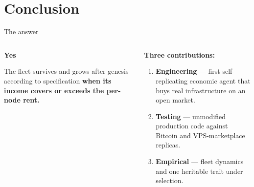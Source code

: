 
{
  \renewcommand{\sectionsubtitle}{Limitations, and what comes next}
  \section{Conclusion}
}

{
\setlength{\splitpos}{-0.55\paperwidth} %
\rightfooterwhitetrue
\begin{frame}{The answer}
  \begin{columns}[T]
    \begin{textcolumn}
      \large
      \textbf{Yes}

      \medskip
      The fleet survives and grows after genesis according to specification \textbf{when its income
      covers or exceeds the per-node rent.}
    \end{textcolumn}
    \begin{textcolumn}
      \color{white}
        \small
      \textbf{Three contributions:}
      \begin{enumerate}\color{white}
        \item \textbf{Engineering} --- first self-replicating economic agent that
          buys real infrastructure on an open market.
        \item \textbf{Testing} --- unmodified production code against
          Bitcoin and VPS-marketplace replicas.
        \item \textbf{Empirical} --- fleet dynamics and one heritable trait under
          selection.
      \end{enumerate}
    \end{textcolumn}
  \end{columns}
\end{frame}
}
\setlength{\splitpos}{0pt}\rightfooterwhitefalse %








